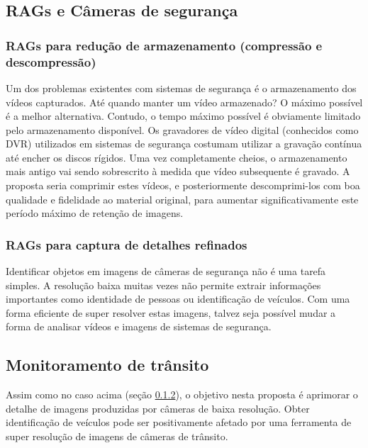 \subsection{RAGs e Câmeras de segurança}
\label{sec:trabalhos-futuros:monitoramento:camera-seguranca}

\subsubsection{RAGs para redução de armazenamento (compressão e descompressão)}
\label{sec:trabalhos-futuros:monitoramento:camera-seguranca:compressao-descompressao}

Um dos problemas existentes com sistemas de segurança é o armazenamento dos vídeos capturados. Até quando manter um vídeo armazenado? O máximo possível é a melhor alternativa. Contudo, o tempo máximo possível é obviamente limitado pelo armazenamento disponível. Os gravadores de vídeo digital (conhecidos como DVR) utilizados em sistemas de segurança costumam utilizar a gravação contínua até encher os discos rígidos. Uma vez completamente cheios, o armazenamento mais antigo vai sendo sobrescrito à medida que vídeo subsequente é gravado. A proposta seria comprimir estes vídeos, e posteriormente descomprimi-los com boa qualidade e fidelidade ao material original, para aumentar significativamente este período máximo de retenção de imagens. 

\subsubsection{RAGs para captura de detalhes refinados}
\label{sec:trabalhos-futuros:monitoramento:camera-seguranca:extracao-detalhes}

Identificar objetos em imagens de câmeras de segurança não é uma tarefa simples. A resolução baixa muitas vezes não permite extrair informações importantes como identidade de pessoas ou identificação de veículos. Com uma forma eficiente de super resolver estas imagens, talvez seja possível mudar a forma de analisar vídeos e imagens de sistemas de segurança. 

\subsection{Monitoramento de trânsito}
\label{sec:trabalhos-futuros:monitoramento:transito}

Assim como no caso acima (seção \ref{sec:trabalhos-futuros:monitoramento:camera-seguranca:extracao-detalhes}), o objetivo nesta proposta é aprimorar o detalhe de imagens produzidas por câmeras de baixa resolução. Obter identificação de veículos pode ser positivamente afetado por uma ferramenta de super resolução de imagens de câmeras de trânsito. 

